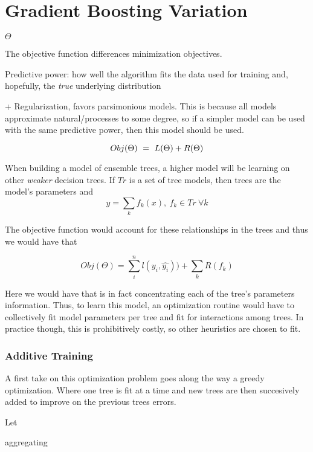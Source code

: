 \section{Gradient Boosting Variation}


$\Theta$

The objective function differences minimization objectives. 

Predictive power: how well the algorithm fits the data used for training and, hopefully, the \textit{true} underlying distribution

+ Regularization, favors parsimonious models. This is because all models approximate natural/processes to some degree, so if a simpler model can be used with the same predictive power, then this model should be used.  

\begin{equation} \label{eq:objFunction}
Obj(\Theta) \ = \ L(\Theta) + R(\Theta)
\\
\end{equation}

When building a model of ensemble trees, a higher model will be learning on other \textit{weaker} decision trees. If $Tr$ is a set of tree models, then trees are the model's parameters and
\[ y = \sum_k f_k(x) , \ f_k \in Tr \ \forall k \]
 
The objective function would account for these relationships in the trees and thus we would have that
 
\[ Obj(\Theta) = \sum_i^n l(y_i,\hat{y_i}))  +  \sum_k R(f_k) \] 

%    

Here we would have that \Theta is in fact concentrating each of the tree's parameters information. Thus, to learn this model, an optimization routine would have to collectively fit model parameters per tree and fit for interactions among trees. In practice though, this is prohibitively costly, so other heuristics are chosen to fit. 

\subsubsection{Additive Training}

A first take on this optimization problem goes along the way a greedy optimization. Where one tree is fit at a time and new trees are then succesively added to improve on the previous trees errors. 

Let 

aggregating 



